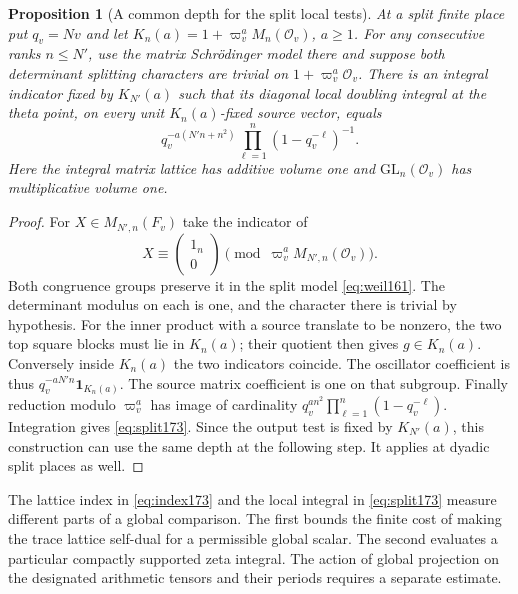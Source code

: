 \documentclass[a4paper,11pt]{article}
\newtheorem{proposition}{Proposition}[section]
\theoremstyle{definition}
\theoremstyle{remark}
\numberwithin{equation}{section}
\newcommand{\OO}{\mathcal O}
\begin{document}
\begin{proposition}[A common depth for the split local tests]
\label{prop:split173}
At a split finite place put \(q_v=Nv\) and let
\(K_n(a)=1+\varpi_v^a M_n(\OO_v)\), \(a\ge1\).
For any consecutive ranks \(n\le N'\), use the matrix
Schr\"odinger model there and suppose both determinant
splitting characters are trivial on \(1+\varpi_v^a\OO_v\).
There is an integral indicator fixed by \(K_{N'}(a)\) such
that its diagonal local doubling integral at the theta point,
on every unit \(K_n(a)\)-fixed source vector, equals
\begin{equation}
  q_v^{-a(N'n+n^2)}
                 \prod_{\ell=1}^n(1-q_v^{-\ell})^{-1}.     \label{eq:split173}
\end{equation}
Here the integral matrix lattice has additive volume one and
\(\mathrm{GL}_n(\OO_v)\) has multiplicative volume one.
\end{proposition}
\begin{proof}
For \(X\in M_{N',n}(F_v)\) take the indicator of
\[
       X\equiv\begin{pmatrix}1_n\\0\end{pmatrix}
                         \pmod{\varpi_v^a M_{N',n}(\OO_v)} .
\]
Both congruence groups preserve it in the split model
\eqref{eq:weil161}. The determinant modulus on each is one,
and the character there is trivial by hypothesis. For the
inner product with a source translate to be nonzero, the
two top square blocks must lie in \(K_n(a)\); their quotient
then gives \(g\in K_n(a)\). Conversely inside \(K_n(a)\) the
two indicators coincide. The oscillator coefficient is thus
\(q_v^{-aN'n}\mathbf1_{K_n(a)}\). The source matrix
coefficient is one on that subgroup. Finally reduction
modulo \(\varpi_v^a\) has image of cardinality
\(q_v^{an^2}\prod_{\ell=1}^n(1-q_v^{-\ell})\).
Integration gives \eqref{eq:split173}. Since the output
test is fixed by \(K_{N'}(a)\), this construction can use
the same depth at the following step. It applies at dyadic
split places as well.
\end{proof}

The lattice index in \eqref{eq:index173} and the local
integral in \eqref{eq:split173} measure different parts of
a global comparison. The first bounds the finite cost of
making the trace lattice self-dual for a permissible global
scalar. The second evaluates a particular compactly supported
zeta integral. The action of global projection on the
designated arithmetic tensors and their periods requires a
separate estimate.
\end{document}
